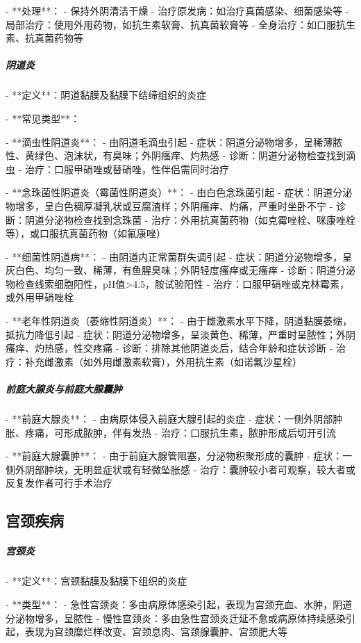 \begin{enumerate}
- **处理**：
  - 保持外阴清洁干燥
  - 治疗原发病：如治疗真菌感染、细菌感染等
  - 局部治疗：使用外用药物，如抗生素软膏、抗真菌软膏等
  - 全身治疗：如口服抗生素、抗真菌药物等

\subparagraph{阴道炎}

- **定义**：阴道黏膜及黏膜下结缔组织的炎症

- **常见类型**：

  - **滴虫性阴道炎**：
    - 由阴道毛滴虫引起
    - 症状：阴道分泌物增多，呈稀薄脓性、黄绿色、泡沫状，有臭味；外阴瘙痒、灼热感
    - 诊断：阴道分泌物检查找到滴虫
    - 治疗：口服甲硝唑或替硝唑，性伴侣需同时治疗

  - **念珠菌性阴道炎（霉菌性阴道炎）**：
    - 由白色念珠菌引起
    - 症状：阴道分泌物增多，呈白色稠厚凝乳状或豆腐渣样；外阴瘙痒、灼痛，严重时坐卧不宁
    - 诊断：阴道分泌物检查找到念珠菌
    - 治疗：外用抗真菌药物（如克霉唑栓、咪康唑栓等），或口服抗真菌药物（如氟康唑）

  - **细菌性阴道病**：
    - 由阴道内正常菌群失调引起
    - 症状：阴道分泌物增多，呈灰白色、均匀一致、稀薄，有鱼腥臭味；外阴轻度瘙痒或无瘙痒
    - 诊断：阴道分泌物检查线索细胞阳性，pH值>4.5，胺试验阳性
    - 治疗：口服甲硝唑或克林霉素，或外用甲硝唑栓

  - **老年性阴道炎（萎缩性阴道炎）**：
    - 由于雌激素水平下降，阴道黏膜萎缩，抵抗力降低引起
    - 症状：阴道分泌物增多，呈淡黄色、稀薄，严重时呈脓性；外阴瘙痒、灼热感，性交疼痛
    - 诊断：排除其他阴道炎后，结合年龄和症状诊断
    - 治疗：补充雌激素（如外用雌激素软膏），外用抗生素（如诺氟沙星栓）

\subparagraph{前庭大腺炎与前庭大腺囊肿}

- **前庭大腺炎**：
  - 由病原体侵入前庭大腺引起的炎症
  - 症状：一侧外阴部肿胀、疼痛，可形成脓肿，伴有发热
  - 治疗：口服抗生素，脓肿形成后切开引流

- **前庭大腺囊肿**：
  - 由于前庭大腺管阻塞，分泌物积聚形成的囊肿
  - 症状：一侧外阴部肿块，无明显症状或有轻微坠胀感
  - 治疗：囊肿较小者可观察，较大者或反复发作者可行手术治疗

\subsection{宫颈疾病}

\subparagraph{宫颈炎}

- **定义**：宫颈黏膜及黏膜下组织的炎症

- **类型**：
  - 急性宫颈炎：多由病原体感染引起，表现为宫颈充血、水肿，阴道分泌物增多，呈脓性
  - 慢性宫颈炎：多由急性宫颈炎迁延不愈或病原体持续感染引起，表现为宫颈糜烂样改变、宫颈息肉、宫颈腺囊肿、宫颈肥大等


\end{enumerate}

